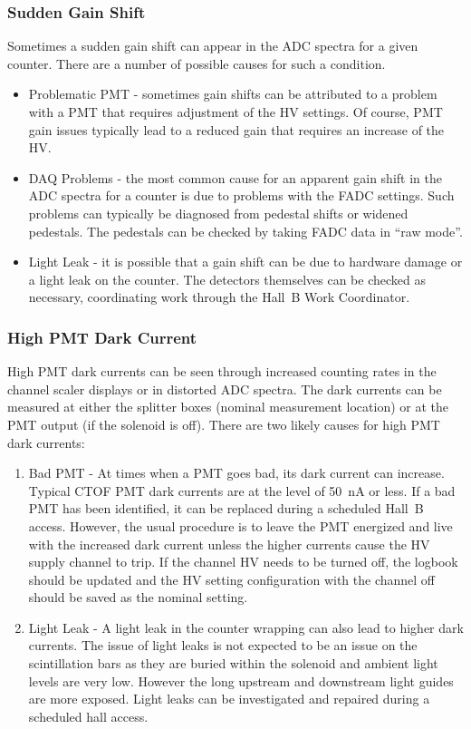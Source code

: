 \documentclass[12pt]{article}
\begin{document}
\subsubsection{Sudden Gain Shift}
\label{gain-shift}

Sometimes a sudden gain shift can appear in the ADC spectra for a given counter. There are a number 
of possible causes for such a condition.

\begin{itemize}
\item Problematic PMT - sometimes gain shifts can be attributed to a problem with a PMT that requires 
adjustment of the HV settings. Of course, PMT gain issues typically lead to a reduced gain that 
requires an increase of the HV. 
\item DAQ Problems - the most common cause for an apparent gain shift in the ADC spectra for a counter 
is due to problems with the FADC settings. Such problems can typically be diagnosed from pedestal 
shifts or widened pedestals. The pedestals can be checked by taking FADC data in ``raw mode''. 
\item Light Leak - it is possible that a gain shift can be due to hardware damage or a light leak 
on the counter. The detectors themselves can be checked as necessary, coordinating work through the 
Hall~B Work Coordinator.
\end{itemize}

\subsubsection{High PMT Dark Current}
\label{high-current}

High PMT dark currents can be seen through increased counting rates in the channel scaler displays 
or in distorted ADC spectra. The dark currents can be measured at either the splitter boxes (nominal 
measurement location) or at the PMT output (if the solenoid is off). There are two likely causes for 
high PMT dark currents:

\begin{enumerate}
\item Bad PMT - At times when a PMT goes bad, its dark current can increase. Typical CTOF PMT dark 
currents are at the level of 50~nA or less. If a bad PMT has been identified, it can be replaced
during a scheduled Hall~B access. However, the usual procedure is to leave the PMT energized and 
live with the increased dark current unless the higher currents cause the HV supply channel to trip. 
If the channel HV needs to be turned off, the logbook should be updated and the HV setting 
configuration with the channel off should be saved as the nominal setting.
\item Light Leak - A light leak in the counter wrapping can also lead to higher dark currents. The 
issue of light leaks is not expected to be an issue on the scintillation bars as they are buried 
within the solenoid and ambient light levels are very low. However the long upstream and downstream
light guides are more exposed. Light leaks can be investigated and repaired during a scheduled hall
access.
\end{enumerate}
\end{document}
